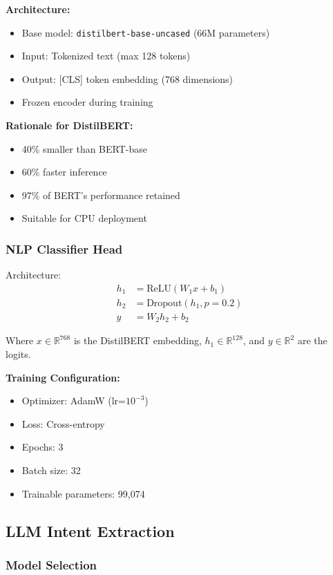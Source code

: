 \textbf{Architecture:}
\begin{itemize}
    \item Base model: \texttt{distilbert-base-uncased} (66M parameters)
    \item Input: Tokenized text (max 128 tokens)
    \item Output: [CLS] token embedding (768 dimensions)
    \item Frozen encoder during training
\end{itemize}

\textbf{Rationale for DistilBERT:}
\begin{itemize}
    \item 40\% smaller than BERT-base
    \item 60\% faster inference
    \item 97\% of BERT's performance retained
    \item Suitable for CPU deployment
\end{itemize}

\subsubsection{NLP Classifier Head}

Architecture:
\begin{align}
h_1 &= \text{ReLU}(W_1 x + b_1) \\
h_2 &= \text{Dropout}(h_1, p=0.2) \\
y &= W_2 h_2 + b_2
\end{align}

Where $x \in \mathbb{R}^{768}$ is the DistilBERT embedding, $h_1 \in \mathbb{R}^{128}$, and $y \in \mathbb{R}^{2}$ are the logits.

\textbf{Training Configuration:}
\begin{itemize}
    \item Optimizer: AdamW (lr=$10^{-3}$)
    \item Loss: Cross-entropy
    \item Epochs: 3
    \item Batch size: 32
    \item Trainable parameters: 99,074
\end{itemize}

\subsection{LLM Intent Extraction}

\subsubsection{Model Selection}

